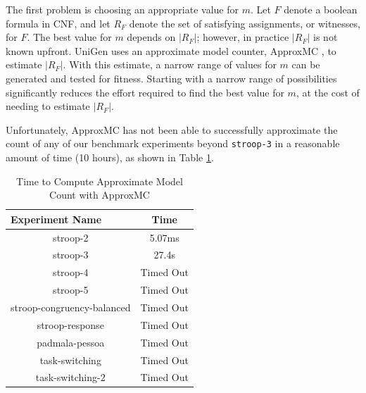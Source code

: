 The first problem is choosing an appropriate value for $m$. Let $F$ denote a boolean formula in CNF, and let $R_F$ denote the set of satisfying assignments, or witnesses, for $F$. The best value for $m$ depends on $|R_F|$; however, in practice $|R_F|$ is not known upfront. UniGen uses an approximate model counter, ApproxMC \cite{DBLP:journals/corr/ChakrabortyMV13}, to estimate $|R_F|$. With this estimate, a narrow range of values for $m$ can be generated and tested for fitness. Starting with a narrow range of possibilities significantly reduces the effort required to find the best value for $m$, at the cost of needing to estimate $|R_F|$.

Unfortunately, ApproxMC has not been able to successfully approximate the count of any of our benchmark experiments beyond \texttt{stroop-3} in a reasonable amount of time (10 hours), as shown in Table \ref{tab:benchmark_experiments_approxmc}.


\begin{table}[b]
  \centering
  \caption{Time to Compute Approximate Model Count with ApproxMC}
\begin{tabular}{|c|c|}
\hline
\multicolumn{1}{|l|}{Experiment Name} & Time            \\ \hline
stroop-2                              & 5.07ms          \\ \hline
stroop-3                              & 27.4s           \\ \hline
stroop-4                              & Timed Out       \\ \hline
stroop-5                              & Timed Out       \\ \hline
stroop-congruency-balanced            & Timed Out       \\ \hline
stroop-response                       & Timed Out       \\ \hline
padmala-pessoa                        & Timed Out       \\ \hline
task-switching                        & Timed Out       \\ \hline
task-switching-2                      & Timed Out       \\ \hline
\end{tabular}
\label{tab:benchmark_experiments_approxmc}%
\end{table}

